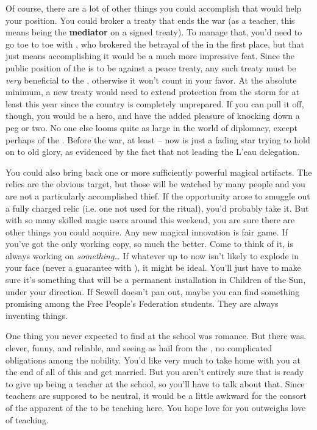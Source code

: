 \documentclass[char]{GL2020}
\begin{document}
Of course, there are a lot of other things you could accomplish that would help your position. You could broker a treaty that ends the war (as a teacher, this means being the \textbf{mediator} on a signed treaty). To manage that, you'd need to go toe to toe with \cDiplomat{\full}, who brokered the betrayal of the \pShip{} in the first place, but that just means accomplishing it would be a much more impressive feat. Since the public position of the \pFarm{} is to be against a peace treaty, any such treaty must be \emph{very} beneficial to the \pFarm{}, otherwise it won't count in your favor. At the absolute minimum, a new treaty would need to extend protection from the storm for at least this year since the country is completely unprepared. If you can pull it off, though, you would be a hero, and have the added pleasure of knocking \cDiplomat{} down a peg or two. No one else looms quite as large in the world of diplomacy, except perhaps \cHeadDiplomat{\full} of the \pShip{}. Before the war, at least – now \cHeadDiplomat{} is just a fading star trying to hold on to old glory, as evidenced by the fact that \cHeadDiplomat{\theyare} not leading the L'eau delegation.

You could also bring back one or more sufficiently powerful magical artifacts. The relics are the obvious target, but those will be watched by many people and you are not a particularly accomplished thief. If the opportunity arose to smuggle out a fully charged relic (i.e. one not used for the ritual), you'd probably take it. But with so many skilled magic users around this weekend, you are sure there are other things you could acquire. Any new magical innovation is fair game. If you've got the only working copy, so much the better. Come to think of it, \cCurse{\full} is always working on \emph{something}\ldots{} If whatever \cCurse{\theyare} up to now isn't likely to explode in your face (never a guarantee with \cCurse{}), it might be ideal. You'll just have to make sure it's something that will be a permanent installation in Children of the Sun, under your direction. If Sewell doesn't pan out, maybe you can find something promising among the Free People's Federation students. They are always inventing things.

One thing you never expected to find at the school was romance. But there \cPirate{} was. \cPirate{\They} \cPirate{\are} clever, funny, and reliable, and seeing as \cPirate{\they} hail\cPirate{\plural} from the \pShip{}, \cPirate{\have} no complicated obligations among the \pFarm{} nobility. You'd like very much to take \cPirate{} home with you at the end of all of this and get married. But you aren't entirely sure that \cPirate{} is ready to give up being a teacher at the school, so you'll have to talk about that. Since teachers are supposed to be neutral, it would be a little awkward for the consort of the \cPrince{\heir} apparent of the \pFarm{} to be teaching here. You hope \cPirate{\their} love for you outweighs \cPirate{\their} love of teaching.
\end{document}
